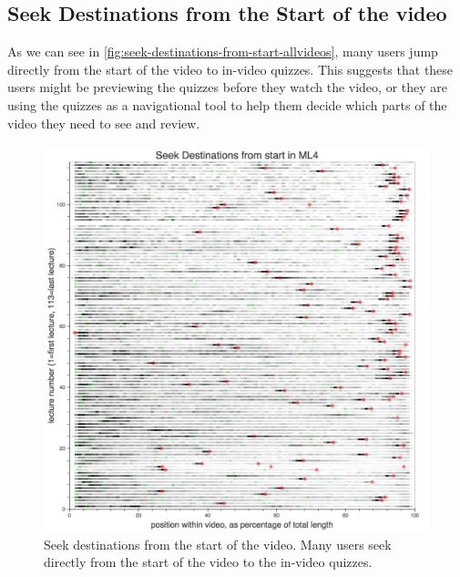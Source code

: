 \documentclass{sigchi}
\begin{document}

\subsection{Seek Destinations from the Start of the video}

As we can see in \autoref{fig:seek-destinations-from-start-allvideos}, many users jump directly from the start of the video to in-video quizzes. This suggests that these users might be previewing the quizzes before they watch the video, or they are using the quizzes as a navigational tool to help them decide which parts of the video they need to see and review.

\begin{figure}
\includegraphics[width=1.0\columnwidth]{seek-destinations-from-start-allvideos}
\caption{Seek destinations from the start of the video. Many users seek directly from the start of the video to the in-video quizzes.}
\label{fig:seek-destinations-from-start-allvideos}
\end{figure}

\end{document}
